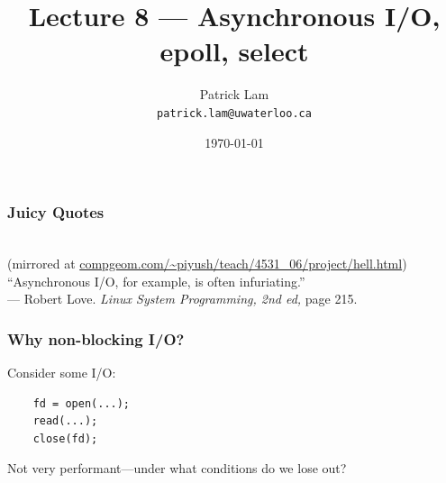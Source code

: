 

\title{Lecture 8 --- Asynchronous I/O, epoll, select}

\author{Patrick Lam \\ \small \texttt{patrick.lam@uwaterloo.ca}}
\date{\today}




\begin{frame}
  \titlepage

 \end{frame}

\begin{frame}
  \frametitle{Juicy Quotes}


  \\
{\scriptsize (mirrored at \url{compgeom.com/~piyush/teach/4531_06/project/hell.html})}
   \\[3em]

   ``Asynchronous I/O, for example, is often infuriating.''\\
--- Robert Love. {\em Linux System Programming, 2nd ed, } page 215.
  

\end{frame}

\begin{frame}[fragile]
  \frametitle{Why non-blocking I/O?}
  
  Consider some I/O:


\begin{minipage}{.5\textwidth}
\begin{lstlisting}
    fd = open(...);
    read(...);
    close(fd);
  \end{lstlisting}
\end{minipage}


  Not very performant---under what conditions do we lose out?

\end{frame}

